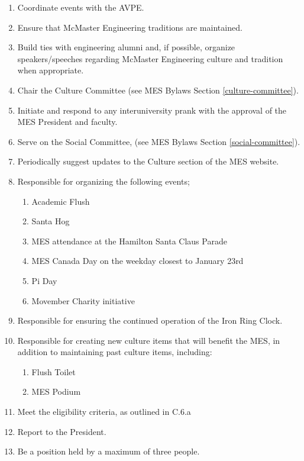 \begin{enumerate}
 \item
  Coordinate events with the AVPE.
 \item
  Ensure that McMaster Engineering traditions are maintained.
 \item
  Build ties with engineering alumni and, if possible, organize
  speakers/speeches regarding McMaster Engineering culture and tradition
  when appropriate.
 \item
  Chair the Culture Committee (see MES Bylaws Section \ref{culture-committee}).
 \item
  Initiate and respond to any interuniversity prank with the approval of
  the MES President and faculty.
 \item
  Serve on the Social Committee, (see MES Bylaws Section \ref{social-committee}).
 \item
  Periodically suggest updates to the Culture section of the MES
  website.
 \item
  Responsible for organizing the following events;

  \begin{enumerate}
   \item
    Academic Flush
   \item
    Santa Hog
   \item
    MES attendance at the Hamilton Santa Claus Parade
   \item
    MES Canada Day on the weekday closest to January 23rd
   \item
    Pi Day
   \item
    Movember Charity initiative
  \end{enumerate}
 \item
  Responsible for ensuring the continued operation of the Iron Ring
  Clock.
 \item
  Responsible for creating new culture items that will benefit the MES,
  in addition to maintaining past culture items, including:

  \begin{enumerate}
   \item
    Flush Toilet
   \item
    MES Podium
  \end{enumerate}
 \item
  Meet the eligibility criteria, as outlined in C.6.a %
 \item
  Report to the President.
 \item
  Be a position held by a maximum of three people.

\end{enumerate}
